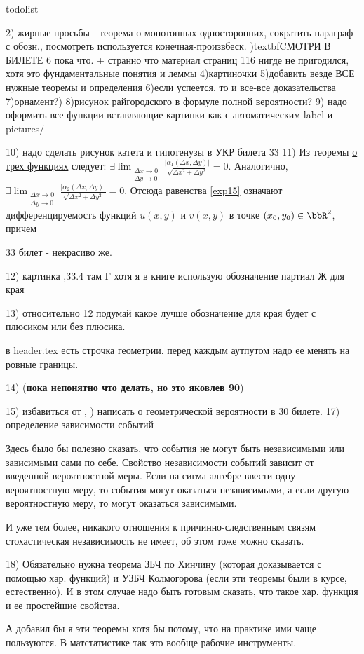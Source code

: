 todolist

 2) жирные просьбы - теорема о монотонных односторонних, сократить параграф с обозн., посмотреть используется конечная-произвбеск.
\3)textbf{CМОТРИ В БИЛЕТЕ 6 пока что. + странно что материал страниц 116 нигде не пригодился, хотя это фундаментальные понятия и леммы}
 4)картиночки
 5)добавить везде ВСЕ нужные теоремы и определения
 6)если успеется. то и все-все доказательства
 7)орнамент?)
 8)рисунок райгородского в формуле полной вероятности?
 9) надо оформить все функции вставляющие картинки как \usepict с автоматическим label и pictures/
 
 10) надо сделать рисунок катета и гипотенузы в УКР билета 33
 11) Из теоремы \hyperref[exp14]{о трех функциях} следует: $\exists \lim_{\substack{\Delta x \to 0\\ \Delta y \to 0}}\limits \frac{|\alpha_1(\Delta x,\Delta y)|}{\sqrt{\Delta x ^2 + \Delta y^2}} = 0.$
Аналогично, $\exists \lim_{\substack{\Delta x \to 0\\ \Delta y \to 0}}\limits \frac{|\alpha_2(\Delta x,\Delta y)|}{\sqrt{\Delta x^2 + \Delta y^2}} = 0$. 
Отсюда равенства \eqref{exp15} означают дифференцируемость функций $u(x,y)$ и $v(x,y)$ в точке $(x_0,y_0) \in \bbR^2$, причем 


33 билет - некрасиво же.

12) картинка ,33.4 там Г хотя я в книге использую обозначение партиал Ж для края

13) относительно 12 подумай какое лучше обозначение для края будет с плюсиком или без плюсика. 

в header.tex есть строчка геометрии. перед каждым аутпутом надо ее менять на ровные границы.

14) (\textbf{пока непонятно что делать, но это яковлев 90})

15) избавиться от \fa, ) написать о геометрической вероятности в 30 билете.
17) определение зависимости событий

Здесь было бы полезно сказать, что события не могут быть независимыми или зависимыми сами по себе. Свойство независимости событий зависит от введенной вероятностной меры. Если на сигма-алгебре ввести одну вероятностную меру, то события могут оказаться независимыми, а если другую вероятностную меру, то могут оказаться зависимыми.

И уже тем более, никакого отношения к причинно-следственным связям стохастическая независимость не имеет, об этом тоже можно сказать.

18) Обязательно нужна теорема ЗБЧ по Хинчину (которая доказывается с помощью хар. функций) и УЗБЧ Колмогорова (если эти теоремы были в курсе, естественно). И в этом случае надо быть готовым сказать, что такое хар. функция и ее простейшие свойства.

А добавил бы я эти теоремы хотя бы потому, что на практике ими чаще  пользуются. В матстатистике так это вообще рабочие инструменты.
